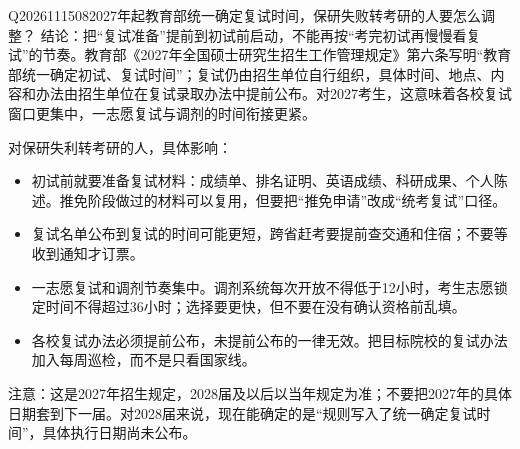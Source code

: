 \begin{qa}{Q2026111508}{2027年起教育部统一确定复试时间，保研失败转考研的人要怎么调整？}
结论：把“复试准备”提前到初试前启动，不能再按“考完初试再慢慢看复试”的节奏。教育部《2027年全国硕士研究生招生工作管理规定》第六条写明“教育部统一确定初试、复试时间”；复试仍由招生单位自行组织，具体时间、地点、内容和办法由招生单位在复试录取办法中提前公布。对2027考生，这意味着各校复试窗口更集中，一志愿复试与调剂的时间衔接更紧。

对保研失利转考研的人，具体影响：

\begin{itemize}
\item 初试前就要准备复试材料：成绩单、排名证明、英语成绩、科研成果、个人陈述。推免阶段做过的材料可以复用，但要把“推免申请”改成“统考复试”口径。
\item 复试名单公布到复试的时间可能更短，跨省赶考要提前查交通和住宿；不要等收到通知才订票。
\item 一志愿复试和调剂节奏集中。调剂系统每次开放不得低于12小时，考生志愿锁定时间不得超过36小时；选择要更快，但不要在没有确认资格前乱填。
\item 各校复试办法必须提前公布，未提前公布的一律无效。把目标院校的复试办法加入每周巡检，而不是只看国家线。
\end{itemize}

注意：这是2027年招生规定，2028届及以后以当年规定为准；不要把2027年的具体日期套到下一届。对2028届来说，现在能确定的是“规则写入了统一确定复试时间”，具体执行日期尚未公布。
\end{qa}
